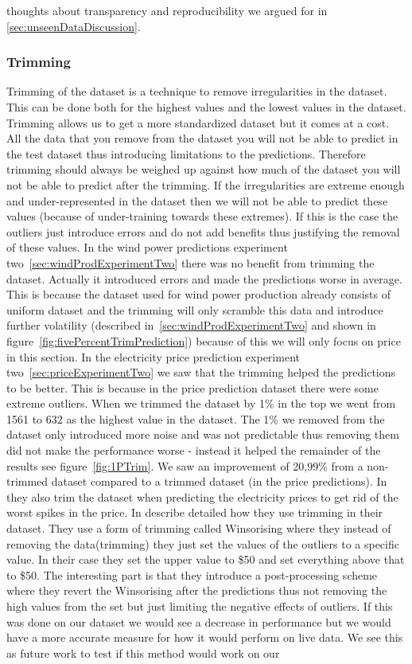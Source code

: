 thoughts about transparency and reproducibility we argued for in \ref{sec:unseenDataDiscussion}.

\subsubsection{Trimming}
Trimming of the dataset is a technique to remove irregularities in the dataset. This can be done both for the highest values and the lowest values in the dataset. Trimming allows us to get a more standardized dataset but it comes at a cost. All the data that you remove from the dataset you will not be able to predict in the test dataset thus introducing limitations to the predictions. Therefore trimming should always be weighed up against how much of the dataset you will not be able to predict after the trimming. If the irregularities are extreme enough and under-represented in the dataset then we will not be able to predict these values (because of under-training towards these extremes). If this is the case the outliers just introduce errors and do not add benefits thus justifying the removal of these values. In the wind power predictions experiment two~\ref{sec:windProdExperimentTwo} there was no benefit from trimming the dataset. Actually it introduced errors and made the predictions worse in average. This is because the dataset used for wind power production already consists of uniform dataset and the trimming will only scramble this data and introduce further volatility (described in~\ref{sec:windProdExperimentTwo} and shown in figure~\ref{fig:fivePercentTrimPrediction}) because of this we will only focus on price in this section. In the electricity price prediction experiment two~\ref{sec:priceExperimentTwo} we saw that the trimming helped the predictions to be better. This is because in the price prediction dataset there were some extreme outliers. When we trimmed the dataset by 1\% in the top we went from 1561 to 632 as the highest value in the dataset. The 1\% we removed from the dataset only introduced more noise and was not predictable thus removing them did not make the performance worse - instead it helped the remainder of the results see figure~\ref{fig:1PTrim}. We saw an improvement of 20,99\% from a non-trimmed dataset compared to a trimmed dataset (in the price predictions). In \cite{singhal2011electricity, yamin2004adaptive} they also trim the dataset when predicting the electricity prices to get rid of the worst spikes in the price. In \cite{yamin2004adaptive} describe detailed how they use trimming in their dataset. They use a form of trimming called Winsorising\cite{Winsorising} where they instead of removing the data(trimming) they just set the values of the outliers to a specific value. In their case they set the upper value to \$50 and set everything above that to \$50. The interesting part is that they introduce a post-processing scheme where they revert the Winsorising after the predictions thus not removing the high values from the set but just limiting the negative effects of outliers. If this was done on our dataset we would see a decrease in performance but we would have a more accurate measure for how it would perform on live data. We see this as future work to test if this method would work on our 